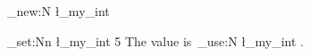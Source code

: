 \documentclass{article}
\begin{document}
\ExplSyntaxOn

\int_new:N \l_my_int

\int_set:Nn \l_my_int { 5 }
The value is~\int_use:N \l_my_int .

\ExplSyntaxOff
\end{document}

